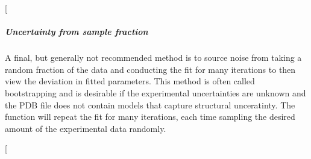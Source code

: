 \documentclass[a4paper,10pt,english,openany,oneside]{sphinxmanual}
\begin{document}
\sphinxAtStartPar
{} {[}\sphinxcode{\sphinxupquote{monte\_carlo.png}}{]}

\noindent{}


\subparagraph{Uncertainty from sample fraction}
\label{\detokenize{examples/pcs_fit_uncertainty:uncertainty-from-sample-fraction}}
\sphinxAtStartPar
A final, but generally not recommended method is to source noise from taking a random fraction of the data and conducting the fit for many iterations to then view the deviation in fitted parameters. This method is often called bootstrapping and is desirable if the experimental uncertainties are unknown and the PDB file does not contain models that capture structural unceratinty. The function {\hyperref[\detokenize{reference/generated/paramagpy.fit.fit_error_bootstrap:paramagpy.fit.fit_error_bootstrap}]{}} will repeat the fit for many iterations, each time sampling the desired amount of the experimental data randomly.

\begin{sphinxVerbatim}[commandchars=\\\{\}]
\PYG{p}{[}\PYG{p}{]} \PYG{p}{[}\PYG{p}{]}   
	  \PYG{p}{[}\PYG{p}{]} \PYG{p}{[}\PYG{p}{]}

\end{sphinxVerbatim}

\sphinxAtStartPar
{} {[}\sphinxcode{\sphinxupquote{error\_tensor\_bootstrap.txt}}{]}
\end{document}
